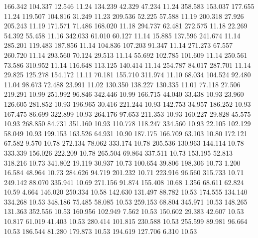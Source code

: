  166.342  104.337   12.546        11.24
 134.239   42.329   47.234        11.24
 358.583  153.037  177.655        11.24
 119.507  104.816   31.249        11.23
 209.536   52.225   57.588        11.19
 200.318   27.926  205.243        11.19
 171.571   71.486  168.020        11.18
 294.737   62.481  272.575        11.18
  22.269   54.392   55.458        11.16
 342.033   61.010   60.127        11.14
  15.885  137.596  241.674        11.14
 285.201  119.483  187.856        11.14
 104.836  107.203   91.347        11.14
 271.273   67.557  260.720        11.14
 293.560   70.124   29.513        11.14
  55.692  102.785  101.609        11.14
 250.561   73.586  310.952        11.14
 116.648  113.125  140.414        11.14
 254.787   84.017  287.701        11.14
  29.825  125.278  154.172        11.11
  70.181  155.710  311.974        11.10
  68.034  104.524   92.480        11.04
  98.673   72.488   23.991        11.02
 130.350  138.227  130.335        11.01
  77.118   27.506  219.291        10.99
 251.992   96.846  342.446        10.99
 166.715   44.040   33.438        10.93
  23.960  126.605  281.852        10.93
 196.965   30.416  221.244        10.93
 142.753   34.957  186.252        10.93
 167.475   86.699  322.899        10.93
 264.176   97.653  211.353        10.93
 160.227   29.828   45.575        10.93
 268.850   84.731  351.160        10.93
 110.778  118.247  334.560        10.93
  22.105  102.129   58.049        10.93
 199.153  163.526   64.931        10.90
 187.175  166.709   63.103        10.80
 172.121   67.582    9.570        10.78
 272.134   78.062  333.174        10.78
 205.536  130.963  144.114        10.78
 333.339  156.026  222.209        10.78
 265.504   69.864  337.511        10.73
 153.195   52.813  318.216        10.73
 341.802   19.119   30.937        10.73
 100.654   39.806  198.306        10.73
   1.200   16.584   48.964        10.73
 284.626   94.719  201.232        10.71
 223.916   96.560  315.733        10.71
 249.142   88.070  335.941        10.69
 271.156   91.874  155.408        10.68
   1.356   68.611   62.824        10.59
   4.664  146.020  250.334        10.58
 142.630  131.497   88.782        10.53
 174.555  134.140  334.268        10.53
 348.186   75.485   58.085        10.53
 259.153   68.804  345.971        10.53
 148.265  131.363  352.556        10.53
 160.956  102.949    7.562        10.53
 150.602   29.383   42.607        10.53
  10.817   61.019   41.403        10.53
 280.414  101.815  230.588        10.53
 255.599   89.981   96.664        10.53
 186.544   81.280  179.873        10.53
 194.619  127.706    6.310        10.53
